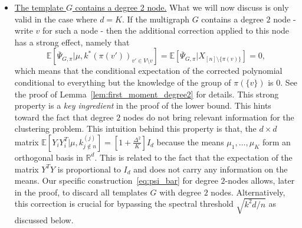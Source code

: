 \documentclass{article}
\begin{document}
\begin{itemize}
\item \underline{The template $G$ contains a degree 2 node.} What we will now discuss is only valid in the case where $d=K$. If the multigraph $G$ contains a degree $2$ node - write $v$ for such a node - then the additional correction applied to this node has a strong effect, namely that 
$$\mathbb{E}[\overline{\Psi}_{G,\pi}|\mu, k^*(\pi(v'))_{v'\in V\setminus v}] = \mathbb{E}[\overline{\Psi}_{G,\pi}|X_{[n]\setminus\{\pi(v)\}}] = 0,$$
which means that the conditional expectation of the corrected polynomial conditional to everything but the knowledge of the group of $\pi(\{v\})$ is $0$. See the proof of Lemma~\ref{lem:first_moment_degree2} for details.
This strong property is a \textit{key ingredient} in the proof of the lower bound. This hints toward the fact that degree $2$ nodes do not bring relevant information for the clustering problem. This intuition behind this property is that, the $d\times d$ matrix $\mathbb{E}[Y_{i}Y_{i}^T|\mu, k^(j)_{j\notin n}]= [1+ \frac{\Delta^2}{K}] I_d$ because the means $\mu_1,\ldots, \mu_K$ form an orthogonal basis in $\mathbb{R}^d$. This is related to the fact that the expectation of the matrix $Y^T Y$ is proportional to $I_d$ and does not carry any information on the means. Our specific construction~\eqref{eq:psi_bar} for degree $2$-nodes allows, later in the proof, to discard all templates $G$ with degree $2$ nodes. Alternatively, this correction is crucial for bypassing the spectral threshold $\sqrt{k^2d/n}$ as discussed below.



\end{itemize}
\end{document}
